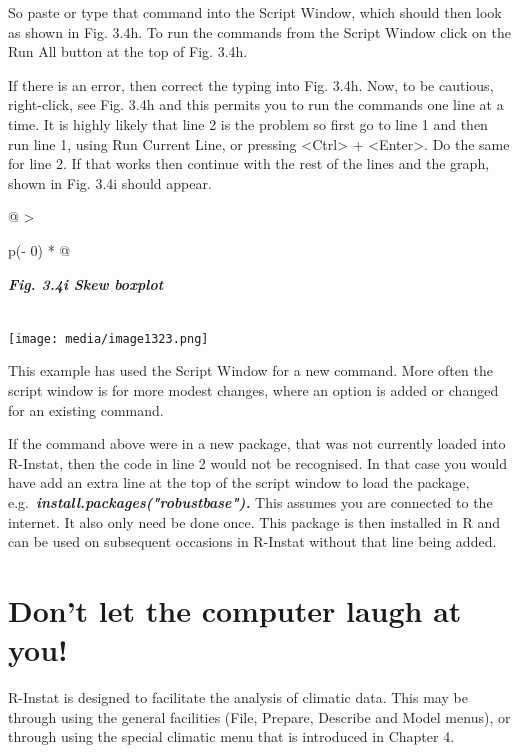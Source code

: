 \documentclass[
  letterpaper,
  DIV=11,
  numbers=noendperiod]{scrreprt}
\begin{document}
So paste or type that command into the Script Window, which should then
look as shown in Fig. 3.4h. To run the commands from the Script Window
click on the Run All button at the top of Fig. 3.4h.

If there is an error, then correct the typing into Fig. 3.4h. Now, to be
cautious, right-click, see Fig. 3.4h and this permits you to run the
commands one line at a time. It is highly likely that line 2 is the
problem so first go to line 1 and then run line 1, using Run Current
Line, or pressing \textless Ctrl\textgreater{} +
\textless Enter\textgreater. Do the same for line 2. If that works then
continue with the rest of the lines and the graph, shown in Fig. 3.4i
should appear.

\begin{longtable}[]{@{}
  >{\raggedright\arraybackslash}p{(\columnwidth - 0\tabcolsep) * }@{}}
\toprule\noalign{}
\begin{minipage}[b]{\linewidth}\raggedright
\textbf{\emph{Fig. 3.4i Skew boxplot}}
\end{minipage} \\
\midrule\noalign{}
\endhead
\bottomrule\noalign{}
\endlastfoot
\texttt{[image: media/image1323.png]} \\
\end{longtable}

This example has used the Script Window for a new command. More often
the script window is for more modest changes, where an option is added
or changed for an existing command.

If the command above were in a new package, that was not currently
loaded into R-Instat, then the code in line 2 would not be recognised.
In that case you would have add an extra line at the top of the script
window to load the package,
e.g.~\textbf{\emph{install.packages("robustbase").}} This assumes you
are connected to the internet. It also only need be done once. This
package is then installed in R and can be used on subsequent occasions
in R-Instat without that line being added.

\section{Don't let the computer laugh at
you!}\label{dont-let-the-computer-laugh-at-you}

R-Instat is designed to facilitate the analysis of climatic data. This
may be through using the general facilities (File, Prepare, Describe and
Model menus), or through using the special climatic menu that is
introduced in Chapter 4.
\end{document}
